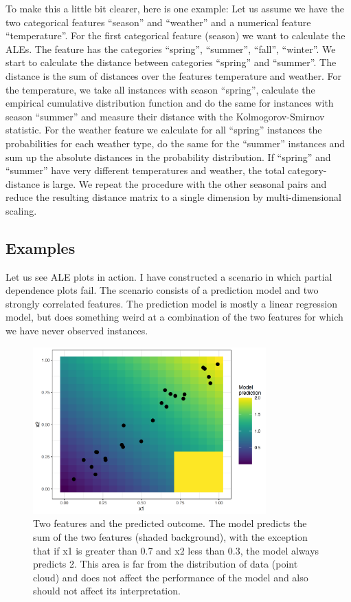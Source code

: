 \documentclass[
  11pt,
]{scrbook}
\begin{document}
To make this a little bit clearer, here is one example:
Let us assume we have the two categorical features ``season'' and ``weather'' and a numerical feature ``temperature''.
For the first categorical feature (season) we want to calculate the ALEs.
The feature has the categories ``spring'', ``summer'', ``fall'', ``winter''.
We start to calculate the distance between categories ``spring'' and ``summer''.
The distance is the sum of distances over the features temperature and weather.
For the temperature, we take all instances with season ``spring'', calculate the empirical cumulative distribution function and do the same for instances with season ``summer'' and measure their distance with the Kolmogorov-Smirnov statistic.
For the weather feature we calculate for all ``spring'' instances the probabilities for each weather type, do the same for the ``summer'' instances and sum up the absolute distances in the probability distribution.
If ``spring'' and ``summer'' have very different temperatures and weather, the total category-distance is large.
We repeat the procedure with the other seasonal pairs and reduce the resulting distance matrix to a single dimension by multi-dimensional scaling.

\hypertarget{examples-1}{%
\subsection{Examples}\label{examples-1}}

Let us see ALE plots in action.
I have constructed a scenario in which partial dependence plots fail.
The scenario consists of a prediction model and two strongly correlated features.
The prediction model is mostly a linear regression model, but does something weird at a combination of the two features for which we have never observed instances.

\begin{figure}

{\centering \includegraphics[width=0.8\textwidth]{images/correlation-problem-1} 

}

\caption{Two features and the predicted outcome. The model predicts the sum of the two features (shaded background), with the exception that if x1 is greater than 0.7 and x2 less than 0.3, the model always predicts 2. This area is far from the distribution of data (point cloud) and does not affect the performance of the model and also should not affect its interpretation.}\label{fig:correlation-problem}
\end{figure}
\end{document}
